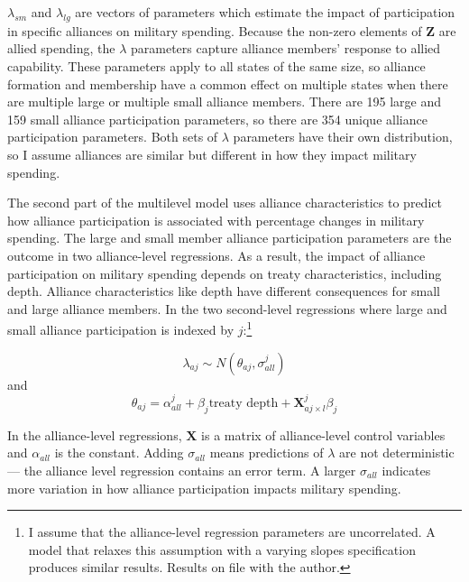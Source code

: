 \documentclass[12pt]{article}
\begin{document}
$\lambda_{sm}$ and $\lambda_{lg}$ are vectors of parameters which estimate the impact of participation in specific alliances on military spending. 
Because the non-zero elements of $\textbf{Z}$ are allied spending, the $\lambda$ parameters capture alliance members' response to allied capability. 
These parameters apply to all states of the same size, so alliance formation and membership have a common effect on multiple states when there are multiple large or multiple small alliance members.
There are 195 large and 159 small alliance participation parameters, so there are 354 unique alliance participation parameters. 
Both sets of $\lambda$ parameters have their own distribution, so I assume alliances are similar but different in how they impact military spending. 


The second part of the multilevel model uses alliance characteristics to predict how alliance participation is associated with percentage changes in military spending. 
The large and small member alliance participation parameters are the outcome in two alliance-level regressions.
As a result, the impact of alliance participation on military spending depends on treaty characteristics, including depth. 
Alliance characteristics like depth have different consequences for small and large alliance members. 
In the two second-level regressions where large and small alliance participation is indexed by $j$:\footnote{I assume that the alliance-level regression parameters are uncorrelated. A model that relaxes this assumption with a varying slopes specification produces similar results. Results on file with the author.}


\begin{equation}
\lambda_{aj} \sim N(\theta_{aj}, \sigma^{j}_{all})
\end{equation} 
and 
\begin{equation}
\theta_{aj} = \alpha^{j}_{all} + \beta_{j} \mbox{treaty depth} + \textbf{X}^{j}_{aj \times l} \beta_{j}
\end{equation}


In the alliance-level regressions, $\textbf{X}$ is a matrix of alliance-level control variables and $\alpha_{all}$ is the constant.
Adding $\sigma_{all}$ means predictions of $\lambda$ are not deterministic--- the alliance level regression contains an error term. 
A larger $\sigma_{all}$ indicates more variation in how alliance participation impacts military spending. 
\end{document}
